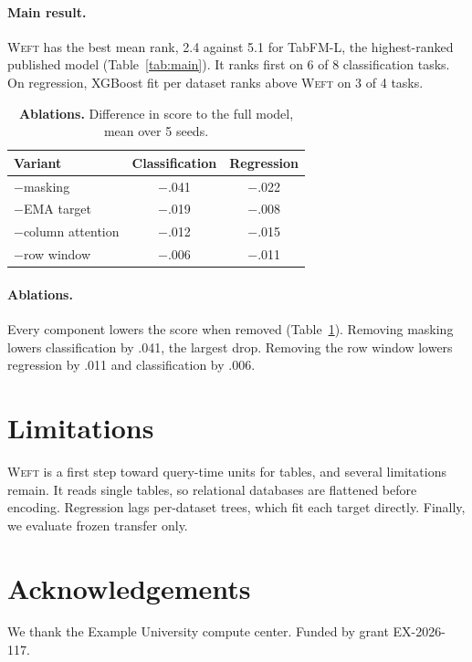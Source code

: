 \documentclass{article}
\newcommand{\weft}{\textsc{Weft}}
\begin{document}
\paragraph{Main result.} \weft{} has the best mean rank, 2.4 against 5.1 for TabFM-L, the highest-ranked published model (Table~\ref{tab:main}). It ranks first on 6 of 8 classification tasks. On regression, XGBoost fit per dataset ranks above \weft{} on 3 of 4 tasks.

\begin{table}[t]
\caption{\textbf{Ablations.} Difference in score to the full model, mean over 5 seeds.}\label{tab:abl}
\centering\small
\begin{tabular}{lcc}
\toprule
Variant & Classification & Regression \\
\midrule
$-$masking & $-$.041 & $-$.022 \\
$-$EMA target & $-$.019 & $-$.008 \\
$-$column attention & $-$.012 & $-$.015 \\
$-$row window & $-$.006 & $-$.011 \\
\bottomrule
\end{tabular}
\end{table}

\paragraph{Ablations.} Every component lowers the score when removed (Table~\ref{tab:abl}). Removing masking lowers classification by .041, the largest drop. Removing the row window lowers regression by .011 and classification by .006.

\section{Limitations}
\weft{} is a first step toward query-time units for tables, and several limitations remain. It reads single tables, so relational databases are flattened before encoding. Regression lags per-dataset trees, which fit each target directly. Finally, we evaluate frozen transfer only.
\label{mainend}

\section*{Acknowledgements}
We thank the Example University compute center. Funded by grant EX-2026-117.



\end{document}
